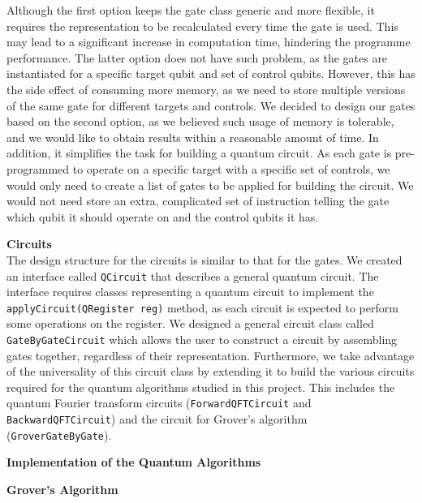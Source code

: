 \documentclass[bibliography=totocnumbered, 10pt]{article}
\newenvironment{myenumerate}{%
  \edef\backupindent{\the\parindent}%
  \enumerate%
  \setlength{\parindent}{\backupindent}%
}{\endenumerate}
\theoremstyle{NoticeStyle}
\begin{document}
\begin{myenumerate}
\begin{enumerate}[(a)]
\end{enumerate}
Although the first option keeps the gate class generic and more flexible, it requires the representation to be recalculated every time the gate is used. This may lead to a significant increase in computation time, hindering the programme performance. The latter option does not have such problem, as the gates are instantiated for a specific target qubit and set of control qubits. However, this has the side effect of consuming more memory, as we need to store multiple versions of the same gate for different targets and controls. We decided to design our gates based on the second option, as we believed such usage of memory is tolerable, and we would like to obtain results within a reasonable amount of time. In addition, it simplifies the task for building a quantum circuit. As each gate is pre-programmed to operate on a specific target with a specific set of controls, we would only need to create a list of gates to be applied for building the circuit. We would not need store an extra, complicated set of instruction telling the gate which qubit it should operate on and the control qubits it has. 
	\item \textbf{Circuits}\\
	The design structure for the circuits is similar to that for the gates. We created an interface called \texttt{QCircuit} that describes a general quantum circuit. The interface requires classes representing a quantum circuit to implement the \texttt{applyCircuit(QRegister reg)} method, as each circuit is expected to perform some operations on the register. We designed a general circuit class called \texttt{GateByGateCircuit} which allows the user to construct a circuit by assembling gates together, regardless of their representation. Furthermore, we take advantage of the universality of this circuit class by extending it to build the various circuits required for the quantum algorithms studied in this project. This includes the quantum Fourier transform circuits (\texttt{ForwardQFTCircuit} and \texttt{BackwardQFTCircuit}) and the circuit for Grover's algorithm (\texttt{GroverGateByGate}).
	
	\item \textbf{Implementation of the Quantum Algorithms}\\
	\begin{myenumerate}
		\item \textbf{Grover's Algorithm}\\
		

\end{myenumerate}
\end{myenumerate}
\end{document}

